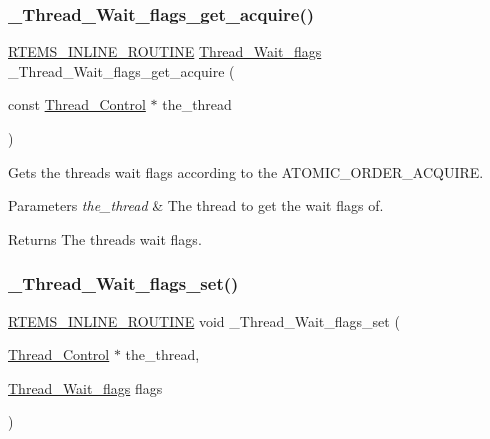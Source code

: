 \subsubsection{\texorpdfstring{\_Thread\_Wait\_flags\_get\_acquire()}{\_Thread\_Wait\_flags\_get\_acquire()}}
{\footnotesize\ttfamily \mbox{\hyperlink{group__RTEMSScoreBaseDefs_gac216239df231d5dbd15e3520b0b9313f}{R\+T\+E\+M\+S\+\_\+\+I\+N\+L\+I\+N\+E\+\_\+\+R\+O\+U\+T\+I\+NE}} \mbox{\hyperlink{group__RTEMSScoreThread_ga9a047ae9c77bc90a258203d4f2cc57db}{Thread\+\_\+\+Wait\+\_\+flags}} \+\_\+\+Thread\+\_\+\+Wait\+\_\+flags\+\_\+get\+\_\+acquire (\begin{DoxyParamCaption}\item[{const \mbox{\hyperlink{struct__Thread__Control}{Thread\+\_\+\+Control}} $\ast$}]{the\+\_\+thread }\end{DoxyParamCaption})}



Gets the thread\textquotesingle{}s wait flags according to the A\+T\+O\+M\+I\+C\+\_\+\+O\+R\+D\+E\+R\+\_\+\+A\+C\+Q\+U\+I\+RE. 


\begin{DoxyParams}{Parameters}
{\em the\+\_\+thread} & The thread to get the wait flags of.\\
\hline
\end{DoxyParams}
\begin{DoxyReturn}{Returns}
The thread\textquotesingle{}s wait flags. 
\end{DoxyReturn}
\mbox{\label{group__RTEMSScoreThread_ga8eb26230b102f8569856d170145a925c}} 
\subsubsection{\texorpdfstring{\_Thread\_Wait\_flags\_set()}{\_Thread\_Wait\_flags\_set()}}
{\footnotesize\ttfamily \mbox{\hyperlink{group__RTEMSScoreBaseDefs_gac216239df231d5dbd15e3520b0b9313f}{R\+T\+E\+M\+S\+\_\+\+I\+N\+L\+I\+N\+E\+\_\+\+R\+O\+U\+T\+I\+NE}} void \+\_\+\+Thread\+\_\+\+Wait\+\_\+flags\+\_\+set (\begin{DoxyParamCaption}\item[{\mbox{\hyperlink{struct__Thread__Control}{Thread\+\_\+\+Control}} $\ast$}]{the\+\_\+thread,  }\item[{\mbox{\hyperlink{group__RTEMSScoreThread_ga9a047ae9c77bc90a258203d4f2cc57db}{Thread\+\_\+\+Wait\+\_\+flags}}}]{flags }\end{DoxyParamCaption})}



